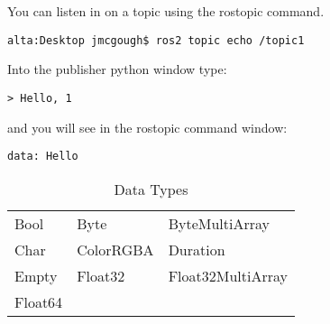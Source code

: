 You can listen in on a topic using the rostopic command.

\begin{verbatim}
alta:Desktop jmcgough$ ros2 topic echo /topic1
\end{verbatim}

Into the publisher python window type:

\begin{verbatim}
> Hello, 1
\end{verbatim}

and you will see in the rostopic command window:

\begin{verbatim}
data: Hello
\end{verbatim}

\begin{longtable}[]{@{}lll@{}}
\caption{Data Types}\tabularnewline
\toprule
\endhead
\begin{minipage}[t]{0.30\columnwidth}\raggedright
Bool\strut
\end{minipage} & \begin{minipage}[t]{0.30\columnwidth}\raggedright
Byte\strut
\end{minipage} & \begin{minipage}[t]{0.30\columnwidth}\raggedright
ByteMultiArray\strut
\end{minipage}\tabularnewline
\begin{minipage}[t]{0.30\columnwidth}\raggedright
Char\strut
\end{minipage} & \begin{minipage}[t]{0.30\columnwidth}\raggedright
ColorRGBA\strut
\end{minipage} & \begin{minipage}[t]{0.30\columnwidth}\raggedright
Duration\strut
\end{minipage}\tabularnewline
\begin{minipage}[t]{0.30\columnwidth}\raggedright
Empty\strut
\end{minipage} & \begin{minipage}[t]{0.30\columnwidth}\raggedright
Float32\strut
\end{minipage} & \begin{minipage}[t]{0.30\columnwidth}\raggedright
Float32MultiArray\strut
\end{minipage}\tabularnewline
\begin{minipage}[t]{0.30\columnwidth}\raggedright
Float64\strut
\end{minipage} & \begin{minipage}[t]{0.30\columnwidth}\raggedright

\end{minipage}
\end{longtable}
